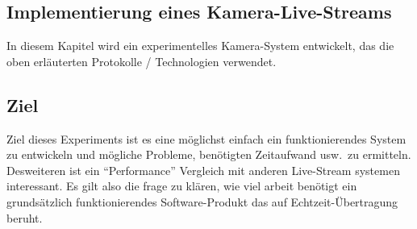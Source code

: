 \documentclass{article}
\begin{document}
\begin{onecolumn}

\section{Implementierung eines Kamera-Live-Streams}

In diesem Kapitel wird ein experimentelles Kamera-System entwickelt, das die
oben erläuterten Protokolle / Technologien verwendet.

\subsection{Ziel}
Ziel dieses Experiments ist es eine möglichst einfach ein funktionierendes
System zu entwickeln und mögliche Probleme, benötigten Zeitaufwand usw.\ zu
ermitteln.  Desweiteren ist ein ``Performance'' Vergleich mit anderen
Live-Stream systemen interessant. Es gilt also die frage zu klären, wie viel
arbeit benötigt ein grundsätzlich funktionierendes Software-Produkt das auf
Echtzeit-Übertragung beruht.


\end{onecolumn}
\end{document}
